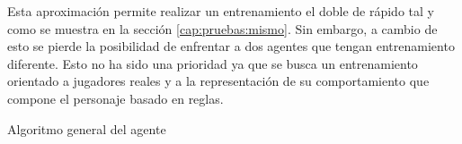 \bigskip

Esta aproximación permite realizar un entrenamiento el doble de rápido tal y como se muestra en la sección \ref{cap:pruebas:mismo}. Sin embargo, a cambio de esto se pierde la posibilidad de enfrentar a dos agentes que tengan entrenamiento diferente. Esto no ha sido una prioridad ya que se busca un entrenamiento orientado a jugadores reales y a la representación de su comportamiento que compone el personaje basado en reglas.




\begin{algorithm}
	
	
	
	\caption{Algoritmo general del agente}
	\label{algoritmo}
\end{algorithm}


